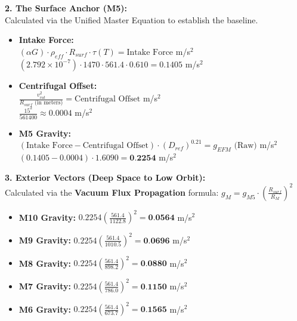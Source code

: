 \documentclass[11pt, a4paper]{article}
\begin{document}
  \vspace{1.0em}
  \noindent \textbf{2. The Surface Anchor (M5):} \\
  \hspace*{1em} Calculated via the Unified Master Equation to establish the baseline.
  \begin{itemize}
    \item \textbf{Intake Force:} \\[0.5em]
    \hspace*{2em} $(\alpha G) \cdot \rho_{eff} \cdot R_{surf} \cdot \tau(T) = \text{Intake Force}$ m/s$^2$ \\[1em]
    \hspace*{2em} $(2.792 \times 10^{-7}) \cdot 1470 \cdot 561.4 \cdot 0.610 = 0.1405$ m/s$^2$
    
    \item \textbf{Centrifugal Offset:} \\[0.5em]
    \hspace*{2em} $\frac{v_{rot}^2}{R_{surf} \text{ (in meters)}} = \text{Centrifugal Offset}$ m/s$^2$ \\[1em]
    \hspace*{2em} $\frac{15^2}{561400} \approx 0.0004$ m/s$^2$
    
    \item \textbf{M5 Gravity:} \\[0.5em]
    \hspace*{2em} $(\text{Intake Force} - \text{Centrifugal Offset}) \cdot (D_{ref})^{0.21} = g_{EFM} \text{ (Raw)}$ m/s$^2$ \\[1em]
    \hspace*{2em} $(0.1405 - 0.0004) \cdot 1.6090 = \textbf{0.2254}$ m/s$^2$
  \end{itemize}

  \clearpage
  \noindent \textbf{3. Exterior Vectors (Deep Space to Low Orbit):} \\
  \hspace*{1em} Calculated via the \textbf{Vacuum Flux Propagation} formula: $g_M = g_{M5} \cdot \left( \frac{R_{surf}}{R_M} \right)^2$
  \begin{itemize}
    \item \textbf{M10 Gravity:} $0.2254 \left( \frac{561.4}{1122.8} \right)^2 = \textbf{0.0564}$ m/s$^2$
    \item \textbf{M9 Gravity:} $0.2254 \left( \frac{561.4}{1010.5} \right)^2 = \textbf{0.0696}$ m/s$^2$
    \item \textbf{M8 Gravity:} $0.2254 \left( \frac{561.4}{898.2} \right)^2 = \textbf{0.0880}$ m/s$^2$
    \item \textbf{M7 Gravity:} $0.2254 \left( \frac{561.4}{786.0} \right)^2 = \textbf{0.1150}$ m/s$^2$
    \item \textbf{M6 Gravity:} $0.2254 \left( \frac{561.4}{673.7} \right)^2 = \textbf{0.1565}$ m/s$^2$
  \end{itemize}
\end{document}

